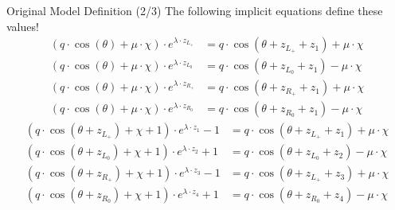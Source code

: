 \begin{frame}{Original Model Definition (2/3)}
    The following implicit equations define these values!
    \begin{subequations}
        \begin{align}
            (q \cdot \cos(\theta) + \mu \cdot \chi) \cdot e^{\lambda \cdot z_{L_+}}
             & = q \cdot \cos(\theta + z_{L_+} + z_1) + \mu \cdot \chi \\
            (q \cdot \cos(\theta) + \mu \cdot \chi) \cdot e^{\lambda \cdot z_{L_0}}
             & = q \cdot \cos(\theta + z_{L_0} + z_1) - \mu \cdot \chi \\
            (q \cdot \cos(\theta) + \mu \cdot \chi) \cdot e^{\lambda \cdot z_{R_+}}
             & = q \cdot \cos(\theta + z_{R_+} + z_1) + \mu \cdot \chi \\
            (q \cdot \cos(\theta) + \mu \cdot \chi) \cdot e^{\lambda \cdot z_{R_0}}
             & = q \cdot \cos(\theta + z_{R_0} + z_1) - \mu \cdot \chi
        \end{align}
    \end{subequations}
    \vspace{-2em}
    \begin{subequations}
        \begin{align}
            (q \cdot \cos(\theta + z_{L_+}) + \chi + 1) \cdot e^{\lambda \cdot z_1} - 1
             & = q \cdot  \cos(\theta + z_{L_+} + z_1) + \mu \cdot \chi \\
            (q \cdot \cos(\theta + z_{L_0}) + \chi + 1) \cdot e^{\lambda \cdot z_2} + 1
             & = q \cdot  \cos(\theta + z_{L_0} + z_2) - \mu \cdot \chi \\
            (q \cdot \cos(\theta + z_{R_+}) + \chi + 1) \cdot e^{\lambda \cdot z_3} - 1
             & = q \cdot  \cos(\theta + z_{L_+} + z_3) + \mu \cdot \chi \\
            (q \cdot \cos(\theta + z_{R_0}) + \chi + 1) \cdot e^{\lambda \cdot z_4} + 1
             & = q \cdot  \cos(\theta + z_{R_0} + z_4) - \mu \cdot \chi
        \end{align}
    \end{subequations}
\end{frame}

